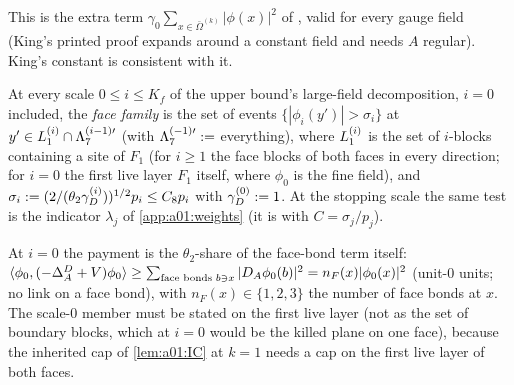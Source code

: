 This is the extra term $\gamma_0\sum_{x\in\bar\Omega^{(k)}}|\phi(x)|^2$ of \cite[Prop.~5.4, (5.26)]{K2}, valid for every gauge field (King's printed proof \cite[(5.28)--(5.29)]{K2} expands around a constant field and needs $A$ regular). King's constant \cite[(5.38)--(5.40)]{K2} is consistent with it.

\begin{definition}\label{def:a01:facefam}
At every scale $0\le i\le K_f$ of the upper bound's large-field decomposition, $i=0$ included, the \emph{face family} is the set of events $\{|\phi_i(y')|>\sigma_i\}$ at $y'\in L_{1}^{(i)}\cap\Lambda_7^{(i-1)\prime}$ (with $\Lambda_7^{(-1)\prime}:=$ everything), where $L_{1}^{(i)}$ is the set of $i$-blocks containing a site of $F_1$ (for $i\ge1$ the face blocks of both faces in every direction; for $i=0$ the first live layer $F_1$ itself, where $\phi_0$ is the fine field), and $\sigma_i:=(2/(\theta_2\gamma_D^{(i)}))^{1/2}p_i\le C_8p_i$ with $\gamma_D^{(0)}:=1$. At the stopping scale the same test is the indicator $\lambda_j$ of \cref{app:a01:weights} (it is \cite[(5.41)]{K2} with $C=\sigma_j/p_j$).
\end{definition}

At $i=0$ the payment is the $\theta_2$-share of the face-bond term itself: $\langle \phi_0,(-\Delta^D_A+V)\phi_0\rangle\ge\sum_{\text{face bonds }b\ni x}|D_A\phi_0(b)|^2=n_F(x)|\phi_0(x)|^2$ (unit-$0$ units; no link on a face bond), with $n_F(x)\in\{1,2,3\}$ the number of face bonds at $x$. The scale-$0$ member must be stated on the first live layer (not as the set of boundary blocks, which at $i=0$ would be the killed plane on one face), because the inherited cap of \cref{lem:a01:IC} at $k=1$ needs a cap on the first live layer of both faces.

